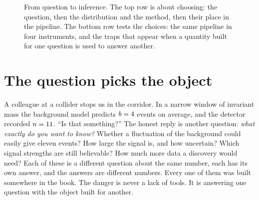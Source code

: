 \begin{figure}[htbp]
\centering
{}
\caption{From question to inference. The top row is about choosing: the question, then the
distribution and the method, then their place in the pipeline. The bottom row tests the
choices: the same pipeline in four instruments, and the traps that appear when a quantity
built for one question is used to answer another.}
\label{14a:fig:roadmap}
\end{figure}

\section{The question picks the object}\label{14a:sec:questions}

A colleague at a collider stops us in the corridor. In a narrow window of invariant
mass the background model predicts $b=4$ events on average, and the detector
recorded $n=11$. ``Is that something?'' The honest reply is another question:
\emph{what exactly do you want to know?} Whether a fluctuation of the background could
easily give eleven events? How large the signal is, and how uncertain? Which signal
strengths are still believable? How much more data a discovery would need? Each of
these is a different question about the same number, each has its own answer, and the
answers are different numbers. Every one of them was built somewhere in the book. The
danger is never a lack of tools. It is answering one question with the object built for
another.

